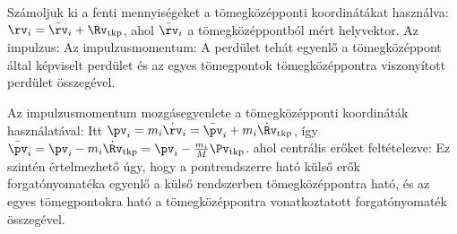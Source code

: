    Számoljuk ki a fenti mennyiségeket a tömegközépponti koordinátákat használva: $\rv_i=\bar\rv_i+\Rv_\text{tkp}$, ahol $\bar\rv_i$ a tömegközéppontból mért helyvektor.
   Az impulzus:
   Az impulzusmomentum:
   A perdület tehát egyenlő a tömegközéppont által képviselt perdület és az egyes tömegpontok tömegközéppontra viszonyított perdület összegével.
   
   Az impulzusmomentum mozgásegyenlete a tömegközépponti koordináták használatával:
   Itt $\pv_i=m_i\dot\rv_i={\bar\pv}_i+m_i\dot{\Rv}_\text{tkp}$, így ${\bar\pv}_i=\pv_i-m_i\dot{\Rv}_\text{tkp}=\pv_i-\frac{m_i}{M}\Pv_\text{tkp}$.
   ahol centrális erőket feltételezve:
   Ez szintén értelmezhető úgy, hogy a pontrendszerre ható külső erők forgatónyomatéka egyenlő a külső rendszerben tömegközéppontra ható, és az egyes tömegpontokra ható a tömegközéppontra vonatkoztatott forgatónyomaték összegével.
   
